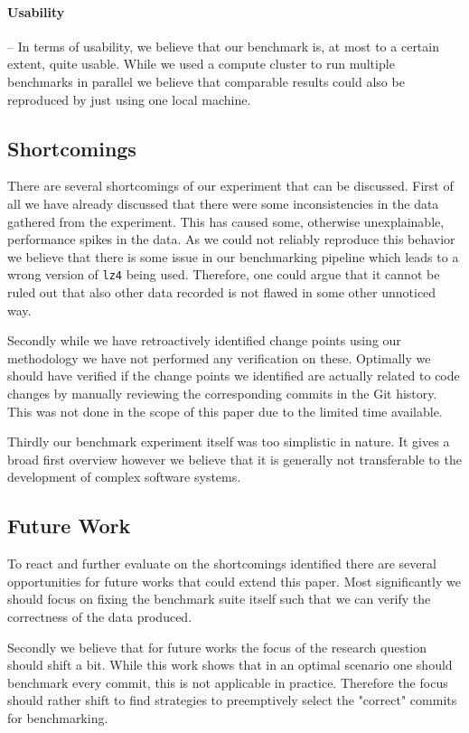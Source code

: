 \documentclass[	runningheads,
				a4paper]{llncs}
\begin{document}
\paragraph{Usability} -- In terms of usability, we believe that our benchmark is, at most to a certain extent, quite usable. While we used a compute cluster to run multiple benchmarks in parallel we believe that comparable results could also be reproduced by just using one local machine.

	\subsection{Shortcomings}
	\label{ssec:refl_shortcomings}
	There are several shortcomings of our experiment that can be discussed. First of all we have already discussed that there were some inconsistencies in the data gathered from the experiment. This has caused some, otherwise unexplainable, performance spikes in the data. As we could not reliably reproduce this behavior we believe that there is some issue in our benchmarking pipeline which leads to a wrong version of \texttt{lz4} being used. Therefore, one could argue that it cannot be ruled out that also other data recorded is not flawed in some other unnoticed way.

	Secondly while we have retroactively identified change points using our methodology we have not performed any verification on these. Optimally we should have verified if the change points we identified are actually related to code changes by manually reviewing the corresponding commits in the Git history. This was not done in the scope of this paper due to the limited time available.

	Thirdly our benchmark experiment itself was too simplistic in nature. It gives a broad first overview however we believe that it is generally not transferable to the development of complex software systems.

	\subsection{Future Work}

	To react and further evaluate on the shortcomings identified there are several opportunities for future works that could extend this paper. Most significantly we should focus on fixing the benchmark suite itself such that we can verify the correctness of the data produced.

	Secondly we believe that for future works the focus of the research question should shift a bit. While this work shows that in an optimal scenario one should benchmark every commit, this is not applicable in practice. Therefore the focus should rather shift to find strategies to preemptively select the "correct" commits for benchmarking.
\end{document}

